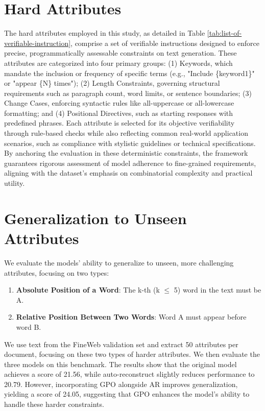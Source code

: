 \clearpage

\section{Hard Attributes}
% 
\label{sec:hard_attr}



The hard attributes employed in this study, as detailed in Table \ref{tab:list-of-verifiable-instruction}, comprise a set of verifiable instructions designed to enforce precise, programmatically assessable constraints on text generation. These attributes are categorized into four primary groups: (1) Keywords, which mandate the inclusion or frequency of specific terms (e.g., "Include \{keyword1\}" or "appear \{N\} times"); (2) Length Constraints, governing structural requirements such as paragraph count, word limits, or sentence boundaries; (3) Change Cases, enforcing syntactic rules like all-uppercase or all-lowercase formatting; and (4) Positional Directives, such as starting responses with predefined phrases. Each attribute is selected for its objective verifiability through rule-based checks while also reflecting common real-world application scenarios, such as compliance with stylistic guidelines or technical specifications. By anchoring the evaluation in these deterministic constraints, the framework guarantees rigorous assessment of model adherence to fine-grained requirements, aligning with the dataset's emphasis on combinatorial complexity and practical utility.

\section{Generalization to Unseen Attributes}
We evaluate the models’ ability to generalize to unseen, more challenging attributes, focusing on two types:
\begin{enumerate} \item \textbf{Absolute Position of a Word}: The k-th (k $\le$ 5) word in the text must be A.
\item \textbf{Relative Position Between Two Words}: Word A must appear before word B.
\end{enumerate}
We use text from the FineWeb validation set and extract 50 attributes per document, focusing on these two types of harder attributes. We then evaluate the three models on this benchmark. The results show that the original model achieves a score of 21.56, while auto-reconstruct slightly reduces performance to 20.79. However, incorporating GPO alongside AR improves generalization, yielding a score of 24.05, suggesting that GPO enhances the model’s ability to handle these harder constraints.

